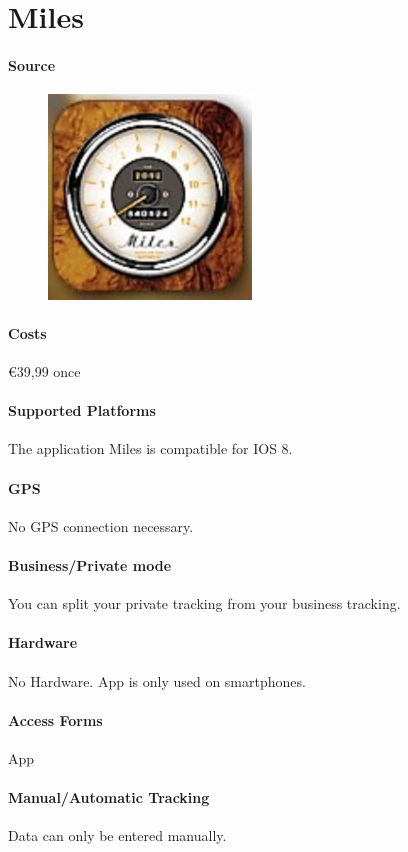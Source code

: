 \section{Miles}
\paragraph{Source} 
\begin{figure}
  \begin{center}
    \includegraphics[width=0.48\textwidth]{miles}
  \end{center}
\end{figure}
\paragraph{Costs} \euro 39,99 once
\paragraph{Supported Platforms} The application Miles is compatible for IOS 8.
\paragraph{GPS} No GPS connection necessary.
\paragraph{Business/Private mode} You can split your private tracking from your business tracking.
\paragraph{Hardware} No Hardware. App is only used on smartphones.
\paragraph{Access Forms} App
\paragraph{Manual/Automatic Tracking} Data can only be entered manually.
